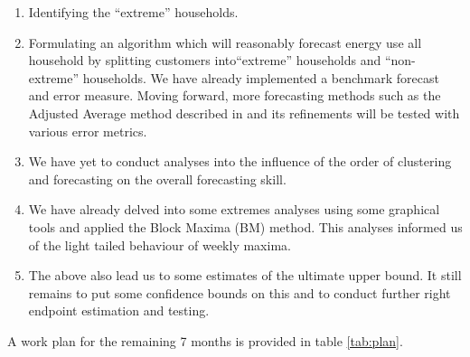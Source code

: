 \documentclass[a4paper]{article}
\begin{document}
\begin{enumerate}
\item Identifying the ``extreme'' households.
\item Formulating an algorithm which will reasonably forecast energy use all household by splitting customers into``extreme'' households and ``non-extreme'' households. We have already implemented a benchmark forecast and error measure. Moving forward, more forecasting methods such as the Adjusted Average method described in \cite{dan14} and its refinements will be tested with various error metrics. 
\item We have yet to conduct analyses into the influence of the order of clustering and forecasting on the overall forecasting skill.
\item We have already delved into some extremes analyses using some graphical tools and applied the Block Maxima (BM) method. This analyses informed us of the light tailed behaviour of weekly maxima.
\item The above also lead us to some estimates of the ultimate upper bound. It still remains to put some confidence bounds on this and to conduct further right endpoint estimation and testing.
\end{enumerate}

A work plan for the remaining 7 months is provided in table \ref{tab:plan}. \newline
\end{document}
